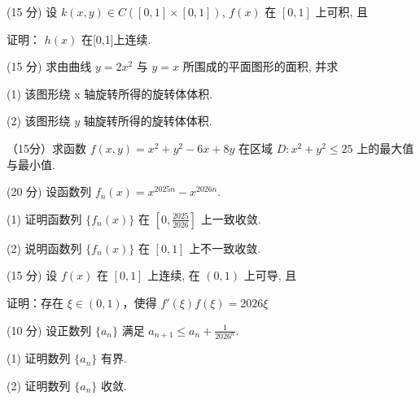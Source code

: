 \par{}
(15 分) 设 $k(x, y) \in C([0, 1] \times [0, 1])$, $f(x)$ 在 $[0, 1]$ 上可积, 且\par
\nopagebreak[4]
证明： $h(x)$ 在[0,1]上连续.\par
\par{}
(15 分) 求由曲线 $y = 2x^{2}$ 与 $y = x$ 所围成的平面图形的面积, 并求\par
(1) 该图形绕 x 轴旋转所得的旋转体体积.\par
(2) 该图形绕 $y$ 轴旋转所得的旋转体体积.\par
\par{}
（15分）求函数 $f(x,y) = x^{2} + y^{2} - 6x + 8y$ 在区域 $D:x^{2} + y^{2}\leq 25$ 上的最大值与最小值.\par
\par{}
(20 分) 设函数列 $f_{n}(x) = x^{2025n} - x^{2026n}$.\par
(1) 证明函数列 $\{f_n(x)\}$ 在 $\left[0, \frac{2025}{2026}\right]$ 上一致收敛.\par
(2) 说明函数列 $\{f_n(x)\}$ 在 $[0,1]$ 上不一致收敛.\par
\par{}
\par{}
(15 分) 设 $f(x)$ 在 $[0, 1]$ 上连续, 在 $(0, 1)$ 上可导, 且\par
\nopagebreak[4]
证明：存在 $\xi \in (0,1)$，使得 $f'(\xi)f(\xi) = 2026\xi$\par
\par{}
(10 分) 设正数列 $\{a_{n}\}$ 满足 $a_{n+1} \leq a_{n} + \frac{1}{2026^{n}}$.\par
(1) 证明数列 $\{a_{n}\}$ 有界.\par
(2) 证明数列 $\{a_{n}\}$ 收敛.\par
